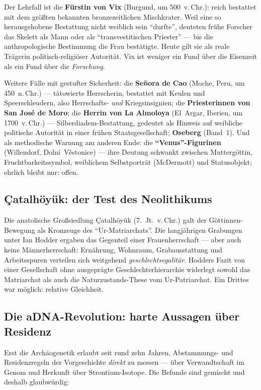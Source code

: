 \documentclass[11pt,a4paper,ngerman]{scrartcl}
\newcommand{\chipbase}[2]{\hspace{0pt}{\footnotesize\textcolor{#1}{[\textsc{#2}]}}}
\newcommand{\chipbelegt}[1]{\chipbase{chipgreen}{#1}}
\newcommand{\chipumstritten}[1]{\chipbase{chipred}{#1}}
\begin{document}
Der Lehrfall ist die \textbf{Fürstin von Vix} (Burgund, um 500~v.\,Chr.): reich bestattet mit dem größten bekannten bronzezeitlichen Mischkrater. Weil eine so herausgehobene Bestattung nicht weiblich sein \enquote{durfte}, deuteten frühe Forscher das Skelett als Mann oder als \enquote{transvestitischen Priester} --- bis die anthropologische Bestimmung die Frau bestätigte. Heute gilt sie als reale Trägerin politisch-religiöser Autorität. Vix ist weniger ein Fund über die Eisenzeit als ein Fund über die \emph{Forschung}. \chipbelegt{belegt}

Weitere Fälle mit gestufter Sicherheit: die \textbf{Señora de Cao} (Moche, Peru, um 450~n.\,Chr.) --- tätowierte Herrscherin, bestattet mit Keulen und Speerschleudern, also Herrschafts- \emph{und} Kriegsinsignien; die \textbf{Priesterinnen von San José de Moro}; die \textbf{Herrin von La Almoloya} (El~Argar, Iberien, um 1700~v.\,Chr.) --- Silberdiadem-Bestattung, gedeutet als Hinweis auf weibliche politische Autorität in einer frühen Staatsgesellschaft; \textbf{Oseberg} (Band~1). Und als methodische Warnung am anderen Ende: die \textbf{\enquote{Venus}-Figurinen} (Willendorf, Dolní~Věstonice) --- ihre Deutung schwankt zwischen Muttergöttin, Fruchtbarkeitssymbol, weiblichem Selbstporträt (McDermott) und Statusobjekt; ehrlich bleibt nur: offen. \chipumstritten{umstritten}

\subsection*{Çatalhöyük: der Test des Neolithikums}
Die anatolische Großsiedlung Çatalhöyük (7.~Jt.~v.\,Chr.) galt der Göttinnen-Bewegung als Kronzeuge des \enquote{Ur-Matriarchats}. Die langjährigen Grabungen unter Ian Hodder ergaben das Gegenteil einer Frauenherrschaft --- aber auch keine Männerherrschaft: Ernährung, Wohnraum, Grabausstattung und Arbeitsspuren verteilen sich weitgehend \emph{geschlechtsegalitär}. Hodders Fazit von einer Gesellschaft ohne ausgeprägte Geschlechterhierarchie widerlegt sowohl das Matriarchat als auch die Naturzustands-These vom Ur-Patriarchat. \chipbelegt{belegt} Ein Drittes war möglich: relative Gleichheit.

\subsection*{Die aDNA-Revolution: harte Aussagen über Residenz}
Erst die Archäogenetik erlaubt seit rund zehn Jahren, Abstammungs- und Residenzregeln der Vorgeschichte \emph{direkt} zu messen --- über Verwandtschaft im Genom und Herkunft über Strontium-Isotope. Die Befunde sind gemischt und deshalb glaubwürdig:
\end{document}
